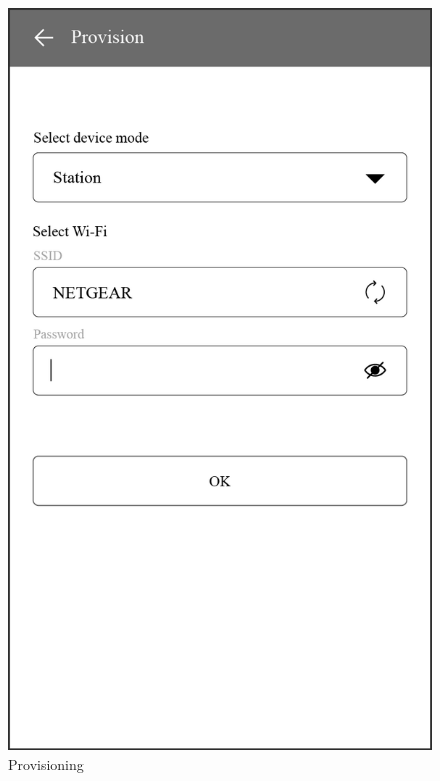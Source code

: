 \documentclass[a4paper,12pt,openany]{book}
\begin{document}
\begin{figure}[!h]
  \Centering
  \begin{minipage}[b]{0.4\textwidth}
    \includegraphics[width=\textwidth]{D7Z/7-42}
    \caption{Provisioning}
  \end{minipage}\hspace{2em}
  \begin{minipage}[b]{0.4\textwidth}

\end{minipage}
\end{figure}
\end{document}
